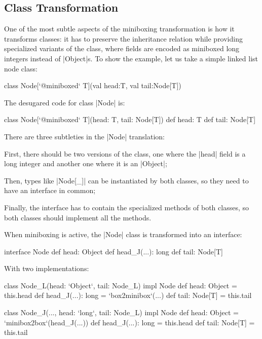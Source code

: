 \subsection{Class Transformation}

One of the most subtle aspects of the miniboxing transformation is how it transforms classes: it has to preserve the inheritance relation while providing specialized variants of the class, where fields are encoded as miniboxed long integers instead of |Object|s. To show the example, let us take a simple linked list node class:

\begin{lstlisting-nobreak}
 class Node[`@miniboxed` T](val head:T, val tail:Node[T])
\end{lstlisting-nobreak}

The desugared code for class |Node| is:

\begin{lstlisting-nobreak}
 class Node[`@miniboxed` T](head: T, tail: Node[T]) {
   def head: T
   def tail: Node[T]
 }
\end{lstlisting-nobreak}

There are three subtleties in the |Node| translation:
\begin{compactitem}
  \item First, there should be two versions of the class, one where the |head| field is a long integer and another one where it is an |Object|;
  \item Then, types like |Node[_]| can be instantiated by both classes, so they need to have an interface in common;
  \item Finally, the interface has to contain the specialized methods of both classes, so both classes should implement all the methods.
\end{compactitem}

When miniboxing is active, the |Node| class is transformed into an interface:

\begin{lstlisting-nobreak}
 interface Node {
   def head: Object
   def head_J(...): long
   def tail: Node[T]
 }
\end{lstlisting-nobreak}

With two implementations:

\begin{lstlisting-nobreak}
 class Node_L(head: `Object`, tail: Node_L) impl Node {
   def head: Object = this.head
   def head_J(...): long = `box2minibox`(...)
   def tail: Node[T] = this.tail
 }

 class Node_J(..., head: `long`, tail: Node_L) impl Node{
   def head: Object = `minibox2box`(head_J(...))
   def head_J(...): long = this.head
   def tail: Node[T] = this.tail
 }
\end{lstlisting-nobreak}

